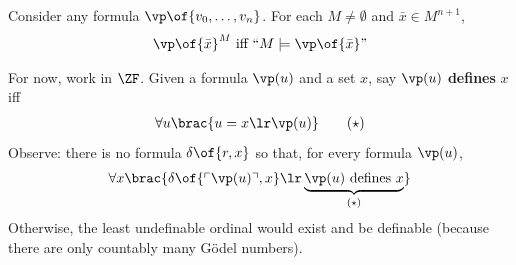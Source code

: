 \begin{boxlemma} \label{Ch3:Lemma:Satisfaction_Relativization}
    Consider any formula $\vp\of{v_0, \ldots, v_n}$. For each $M \ne \emptyset$ and $\bar{x} \in M^{n + 1}$,
    \begin{align*}
        \vp\of{\bar{x}}^M \text{ iff } ``M \models \vp\of{\bar{x}}"
    \end{align*}
\end{boxlemma}

For now, work in $\ZF$. Given a formula $\vp(u)$ and a set $x$, say $\vp(u)$ \textbf{defines} $x$ iff
\begin{align*}
    \forall u \brac{u = x \lr \vp(u)} \tag{$\star$}
\end{align*}
Observe: there is no formula $\delta\of{r, x}$ so that, for every formula $\vp(u)$,
\begin{align*}
    \forall x \brac{\delta\of{\ulcorner \vp(u) \urcorner, x} \lr \underbrace{\vp(u) \text{ defines } x}_{(\star)}}
\end{align*}
Otherwise, the least undefinable ordinal would exist and be definable (because there are only countably many Gödel numbers).
